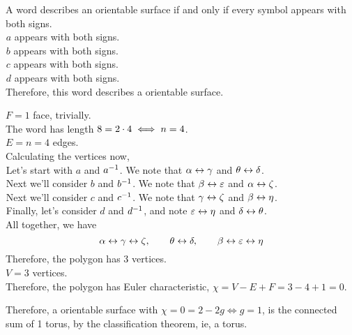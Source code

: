 \documentclass[a4paper,11pt]{report}
\begin{document}
A word describes an orientable surface if and only if every symbol appears with both signs. \\
${}^{}$\hspace{1em}$a$ appears with both signs. \\
${}^{}$\hspace{1em}$b$ appears with both signs. \\
${}^{}$\hspace{1em}$c$ appears with both signs. \\
${}^{}$\hspace{1em}$d$ appears with both signs. \\
Therefore, this word describes a orientable surface. \vspace{0.5em}

$F = 1$ face, trivially. \\
The word has length $8=2\cdot4\iff n = 4$. \\
$E = n = 4$ edges. \\
Calculating the vertices now,\\
${}^{}$\hspace{1em}Let's start with $a$ and $a^{-1}$. We note that $\alpha\leftrightarrow\gamma$ and $\theta\leftrightarrow\delta$. \\
${}^{}$\hspace{1em}Next we'll consider $b$ and $b^{-1}$. We note that $\beta\leftrightarrow\varepsilon$ and $\alpha\leftrightarrow\zeta$. \\
${}^{}$\hspace{1em}Next we'll consider $c$ and $c^{-1}$. We note that $\gamma\leftrightarrow\zeta$ and $\beta\leftrightarrow\eta$. \\
${}^{}$\hspace{1em}Finally, let's consider $d$ and $d^{-1}$, and note $\varepsilon\leftrightarrow\eta$ and $\delta\leftrightarrow\theta$. \\
All together, we have
$$
  \alpha\leftrightarrow\gamma\leftrightarrow\zeta,\qquad\theta\leftrightarrow\delta,\qquad\beta\leftrightarrow\varepsilon\leftrightarrow\eta
$$
Therefore, the polygon has 3 vertices. \\
$V=3$ vertices. \\
Therefore, the polygon has Euler characteristic, $\chi = V - E + F = 3 - 4 + 1 = 0$. \vspace{0.5em}

Therefore, a orientable surface with $\chi=0 = 2-2g \iff g=1$, is the connected sum of 1 torus, by the classification theorem, ie, a torus.

\newpage
{}
\sol\vspace{0.5em}
\end{document}
